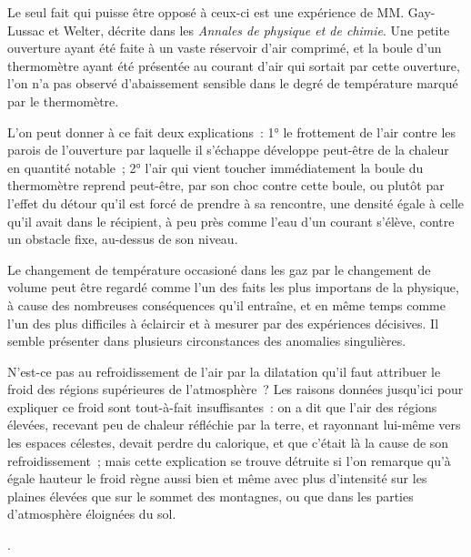 \documentclass[french,twoside]{book} %
\begin{document}
{ \noindent Le seul fait qui puisse être opposé à ceux-ci est une expérience de MM. Gay-Lussac et Welter, décrite dans les \emph{Annales de physique et de chimie}. Une petite ouverture ayant été faite à un vaste réservoir d’air comprimé, et la boule d’un thermomètre ayant été présentée au courant d’air qui sortait par cette ouverture, l’on n’a pas observé d’abaissement sensible dans le degré de température marqué par le thermomètre.\par
 L’on peut donner à ce fait deux explications : 1° le frottement de l’air contre les parois de l’ouverture par laquelle il s’échappe développe peut-être de la chaleur en quantité notable ; 2° l’air qui vient toucher immédiatement la boule du thermomètre reprend peut-être, par son choc contre cette boule, ou plutôt par l’effet du détour qu’il est forcé de prendre à sa rencontre, une densité égale à celle qu’il avait dans le récipient, à peu près comme l’eau d’un courant s’élève, contre un obstacle fixe, au-dessus de son niveau.\par
 Le changement de température occasioné dans les gaz par le changement de volume peut être regardé comme l’un des faits les plus importans de la physique, à cause des nombreuses conséquences qu’il entraîne, et en même temps comme l’un des plus difficiles à éclaircir et à mesurer par des expériences décisives. Il semble présenter dans plusieurs circonstances des anomalies singulières.\par
 N’est-ce pas au refroidissement de l’air par la dilatation qu’il faut attribuer le froid des régions supérieures de l’atmosphère ? Les raisons données jusqu’ici pour expliquer ce froid sont tout-à-fait insuffisantes : on a dit que l’air des régions élevées, recevant peu de chaleur réfléchie par la terre, et rayonnant lui-même vers les espaces célestes, devait perdre du calorique, et que c’était là la cause de son refroidissement ; mais cette explication se trouve détruite si l’on remarque qu’à égale hauteur le froid règne aussi bien et même avec plus d’intensité sur les plaines élevées que sur le sommet des montagnes, ou que dans les parties d’atmosphère éloignées du sol.
}.\par
\end{document}
